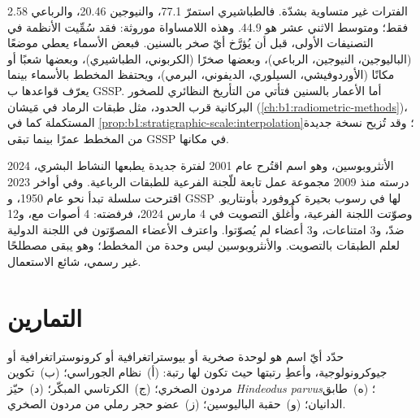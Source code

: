 
الفترات غير متساوية بشدّة. فالطباشيري استمرّ \qty{77.1}{\Myr}، والنيوجين \qty{20.46}{\Myr}، والرباعي \qty{2.58}{\Myr} فقط؛ ومتوسط الاثني عشر هو \qty{44.9}{\Myr}. وهذه اللامساواة موروثة: فقد سُمِّيت الأنظمة في التصنيفات الأولى، قبل أن يُؤرَّخ أيّ صخر بالسنين. فبعض الأسماء يعطي موضعًا (الباليوجين، النيوجين، الرباعي)، وبعضها صخرًا (الكربوني، الطباشيري)، وبعضها شعبًا أو مكانًا (الأوردوفيشي، السيلوري، الديفوني، البرمي)، ويحتفظ المخطط بالأسماء بينما يعرّف قواعدها ب GSSP. أما الأعمار بالسنين فتأتي من التأريخ النظائري للصخور البركانية قرب الحدود، مثل طبقات الرماد في مَيشان (\cref{ch:b1:radiometric-methods})، المستكملة كما في \cref{prop:b1:stratigraphic-scale:interpolation}؛ وقد تُزيح نسخة جديدة من المخطط عمرًا بينما تبقى GSSP في مكانها.

\begin{dated}{2024}
الأنثروبوسين، وهو اسم اقتُرح عام 2001 لفترة جديدة يطبعها النشاط البشري، درسته منذ 2009 مجموعة عمل تابعة للّجنة الفرعية للطبقات الرباعية. وفي أواخر 2023 اقترحت  سلسلة تبدأ نحو عام 1950، و GSSP لها في رسوب بحيرة كروفورد بأونتاريو. وصوّتت اللجنة الفرعية، وأُغلق التصويت في 4 مارس 2024، فرفضته: 4 أصوات مع، و\num{12} ضدّ، و\num{3} امتناعات، و\num{3} أعضاء لم يُصوّتوا. واعترف الأعضاء المصوّتون في اللجنة الدولية لعلم الطبقات بالتصويت. والأنثروبوسين ليس وحدة من المخطط؛ وهو يبقى مصطلحًا غير رسمي، شائع الاستعمال.
\end{dated}

\section{التمارين}

\begin{exercise}[$\star$]\label{exo:b1:stratigraphic-scale:1}
حدّد أيّ اسم هو لوحدة صخرية أو بيوستراتغرافية أو كرونوستراتغرافية أو جيوكرونولوجية، وأعطِ رتبتها حيث تكون لها رتبة: (أ)~نظام الجوراسي؛ (ب)~تكوين مردون الصخري؛ (ج)~الكرتاسي المبكّر؛ (د)~حيّز \emph{Hindeodus parvus}؛ (ه)~طابق الدانيان؛ (و)~حقبة الباليوسين؛ (ز)~عضو حجر رملي من مردون الصخري.
\end{exercise}

